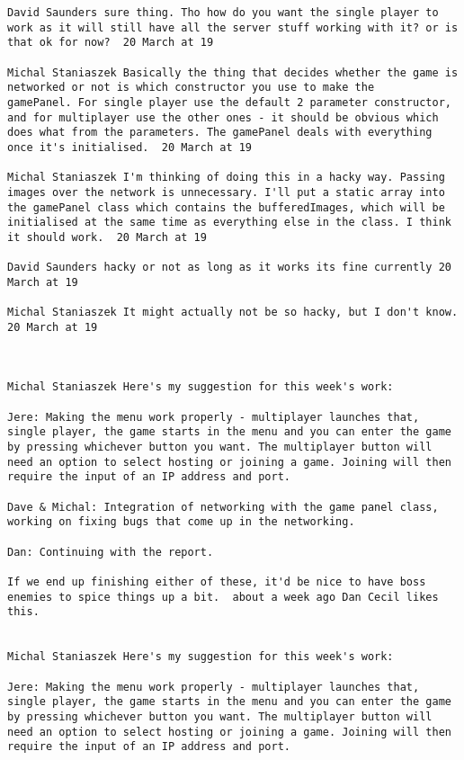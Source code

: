 \begin{verbatim}
David Saunders sure thing. Tho how do you want the single player to
work as it will still have all the server stuff working with it? or is
that ok for now?  20 March at 19

Michal Staniaszek Basically the thing that decides whether the game is
networked or not is which constructor you use to make the
gamePanel. For single player use the default 2 parameter constructor,
and for multiplayer use the other ones - it should be obvious which
does what from the parameters. The gamePanel deals with everything
once it's initialised.  20 March at 19

Michal Staniaszek I'm thinking of doing this in a hacky way. Passing
images over the network is unnecessary. I'll put a static array into
the gamePanel class which contains the bufferedImages, which will be
initialised at the same time as everything else in the class. I think
it should work.  20 March at 19

David Saunders hacky or not as long as it works its fine currently 20
March at 19

Michal Staniaszek It might actually not be so hacky, but I don't know.
20 March at 19



Michal Staniaszek Here's my suggestion for this week's work:

Jere: Making the menu work properly - multiplayer launches that,
single player, the game starts in the menu and you can enter the game
by pressing whichever button you want. The multiplayer button will
need an option to select hosting or joining a game. Joining will then
require the input of an IP address and port.

Dave & Michal: Integration of networking with the game panel class,
working on fixing bugs that come up in the networking.

Dan: Continuing with the report.

If we end up finishing either of these, it'd be nice to have boss
enemies to spice things up a bit.  about a week ago Dan Cecil likes
this.


Michal Staniaszek Here's my suggestion for this week's work:

Jere: Making the menu work properly - multiplayer launches that,
single player, the game starts in the menu and you can enter the game
by pressing whichever button you want. The multiplayer button will
need an option to select hosting or joining a game. Joining will then
require the input of an IP address and port.


\end{verbatim}

